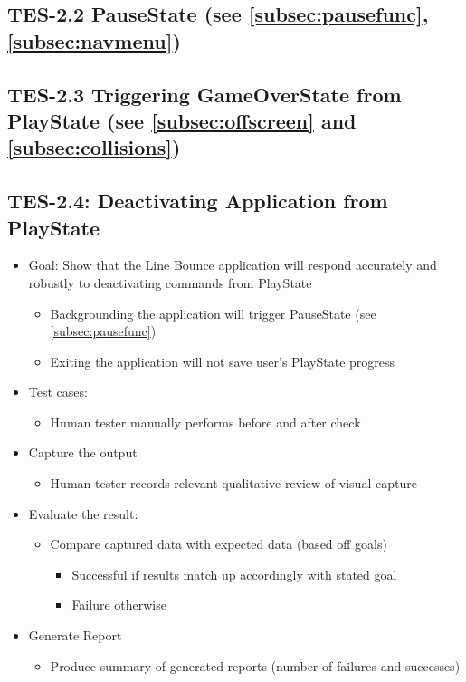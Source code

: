 \subsection{TES-2.2 PauseState (see \ref{subsec:pausefunc}, \ref{subsec:navmenu})}

\subsection{TES-2.3 Triggering GameOverState from PlayState (see \ref{subsec:offscreen} and \ref{subsec:collisions})}

\subsection{TES-2.4: Deactivating Application from PlayState }
\begin{itemize}
\item Goal: Show that the Line Bounce application will respond accurately and robustly to deactivating commands from PlayState
\begin{itemize}
\item Backgrounding the application will trigger PauseState (see \ref{subsec:pausefunc})
\item Exiting the application will not save user’s PlayState progress
\end{itemize}

\item Test cases: 
\begin{itemize}
\item Human tester manually performs before and after check
\end{itemize}

\item Capture the output 
\begin{itemize}
\item Human tester records relevant qualitative review of visual capture
\end{itemize}

\item Evaluate the result: 
\begin{itemize}
\item Compare captured data with expected data (based off goals)
\begin{itemize}
\item Successful if results match up accordingly with stated goal
\item Failure otherwise
\end{itemize}
\end{itemize}

\item Generate Report
\begin{itemize}
\item Produce summary of generated reports (number of failures and successes)
\end{itemize}
\end{itemize}

